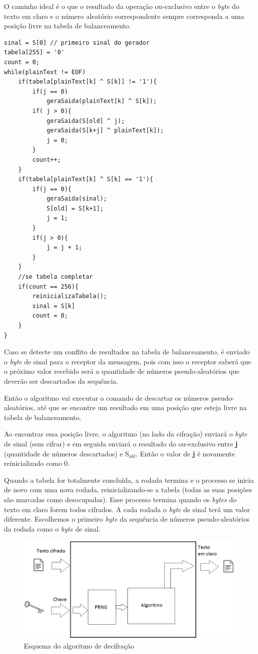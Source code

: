 O caminho ideal é o que o resultado da operação ou-exclusivo entre o \textit{byte} do texto em claro e o número aleatório correspondente sempre corresponda a uma posição livre na tabela de balanceamento.

\begin{lstlisting}[caption={Pseudo-Código}, label=pseudo-codigo]
sinal = S[0] // primeiro sinal do gerador
tabela[255] = '0'
count = 0;
while(plainText != EOF)
	if(tabela[plainText[k] ^ S[k]] != '1'){
		if(j == 0)
			geraSaida(plainText[k] ^ S[k]);
		if( j > 0){
			geraSaida(S[old] ^ j);
			geraSaida(S[k+j] ^ plainText[k]);
			j = 0;
		}
		count++;
	}
	if(tabela[plainText[k] ^ S[k] == '1'){
		if(j == 0){
			geraSaida(sinal);
			S[old] = S[k+1];
			j = 1;		
		}
		if(j > 0){
			j = j + 1;
		}
	}
	//se tabela completar
	if(count == 256){
		reinicializaTabela();
		sinal = S[k]
		count = 0;
	}
}
    \end{lstlisting}


Caso se detecte um conflito de resultados na tabela de balanceamento, é enviado o \textit{byte} de sinal para o receptor da mensagem, pois com isso o receptor saberá que o próximo valor recebido será a quantidade de números pseudo-aleatórios que deverão ser descartados da sequência. 

Então o algoritmo vai executar o comando de descartar os números pseudo-aleatórios, até que se encontre um resultado em uma posição que esteja livre na tabela de balanceamento. 

Ao encontrar essa posição livre, o algoritmo (no lado da cifração) enviará o \textit{byte} de sinal (sem cifrar) e em seguida enviará o resultado do ou-exclusivo entre \textbf{j} (quantidade de números descartados) e S$_{old}$. Então o valor de \textbf{j} é novamente reinicializado como 0.

Quando a tabela for totalmente concluída, a rodada termina e o processo se inicia de novo com uma nova rodada, reinicializando-se a tabela (todas as suas posições são marcadas como desocupadas). Esse processo termina quando os \textit{bytes} do texto em claro forem todos cifrados. A cada rodada o \textit{byte} de sinal terá um valor diferente. Escolhemos o primeiro \textit{byte} da sequência de números pseudo-aleatórios da rodada como o \textit{byte} de sinal.

\begin{figure}[h]
	\centering
	\includegraphics[scale=0.6]{figuras/metodo_de_decifra.eps}
	\caption{Esquema do algoritmo de decifração}
\end{figure}

